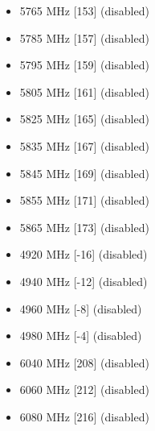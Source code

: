 \begin{itemize}
\item 5765 MHz [153] (disabled)
\item 5785 MHz [157] (disabled)
\item 5795 MHz [159] (disabled)
\item 5805 MHz [161] (disabled)
\item 5825 MHz [165] (disabled)
\item 5835 MHz [167] (disabled)
\item 5845 MHz [169] (disabled)
\item 5855 MHz [171] (disabled)
\item 5865 MHz [173] (disabled)
\item 4920 MHz [-16] (disabled)
\item 4940 MHz [-12] (disabled)
\item 4960 MHz [-8] (disabled)
\item 4980 MHz [-4] (disabled)
\item 6040 MHz [208] (disabled)
\item 6060 MHz [212] (disabled)
\item 6080 MHz [216] (disabled)
\end{itemize}
